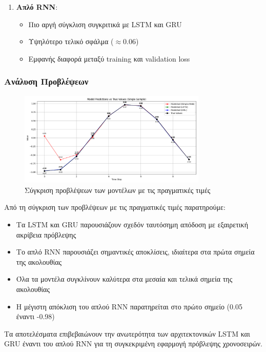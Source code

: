 \documentclass[a4paper,12pt]{article}
\begin{document}
\begin{enumerate}
   \item \textbf{Απλό RNN}:
   \begin{itemize}
       \item Πιο αργή σύγκλιση συγκριτικά με LSTM και GRU
       \item Υψηλότερο τελικό σφάλμα ($\approx 0.06$)
       \item Εμφανής διαφορά μεταξύ training και validation loss
   \end{itemize}
\end{enumerate}

\subsubsection*{Ανάλυση Προβλέψεων}

\begin{figure}[h]
\centering
\includegraphics[width=0.8\textwidth]{pred_step8.png}
\caption{Σύγκριση προβλέψεων των μοντέλων με τις πραγματικές τιμές}
\label{fig:predictions}
\end{figure}

Από τη σύγκριση των προβλέψεων με τις πραγματικές τιμές παρατηρούμε:

\begin{itemize}
   \item Τα LSTM και GRU παρουσιάζουν σχεδόν ταυτόσημη απόδοση με εξαιρετική ακρίβεια πρόβλεψης
   \item Το απλό RNN παρουσιάζει σημαντικές αποκλίσεις, ιδιαίτερα στα πρώτα σημεία της ακολουθίας
   \item Όλα τα μοντέλα συγκλίνουν καλύτερα στα μεσαία και τελικά σημεία της ακολουθίας
   \item Η μέγιστη απόκλιση του απλού RNN παρατηρείται στο πρώτο σημείο (0.05 έναντι -0.98)
\end{itemize}

Τα αποτελέσματα επιβεβαιώνουν την ανωτερότητα των αρχιτεκτονικών LSTM και GRU έναντι του απλού RNN για τη συγκεκριμένη εφαρμογή πρόβλεψης χρονοσειρών.
\end{document}

